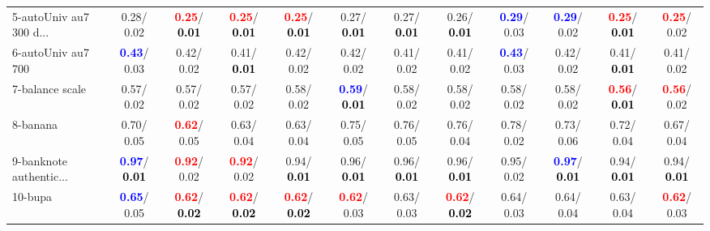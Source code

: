 \begin{table}[h]
\begin{center}
{\begin{tabular}{lc|c|c|c|c|c|c|c|c|c|c}
5-autoUniv au7 300 d... &   0.28/  0.02 & \textcolor{red}{\textbf{  0.25}}/\textcolor{black}{\textbf{  0.01}} & \textcolor{red}{\textbf{  0.25}}/\textcolor{black}{\textbf{  0.01}} & \textcolor{red}{\textbf{  0.25}}/\textcolor{black}{\textbf{  0.01}} &   0.27/\textcolor{black}{\textbf{  0.01}} &   0.27/\textcolor{black}{\textbf{  0.01}} &   0.26/\textcolor{black}{\textbf{  0.01}} & \textcolor{blue}{\textbf{  0.29}}/  0.03 & \textcolor{blue}{\textbf{  0.29}}/  0.02 & \textcolor{red}{\textbf{  0.25}}/\textcolor{black}{\textbf{  0.01}} & \textcolor{red}{\textbf{  0.25}}/  0.02 \\
6-autoUniv au7 700 & \textcolor{blue}{\textbf{  0.43}}/  0.03 &   0.42/  0.02 &   0.41/\textcolor{black}{\textbf{  0.01}} &   0.42/  0.02 &   0.42/  0.02 &   0.41/  0.02 &   0.41/  0.02 & \textcolor{blue}{\textbf{  0.43}}/  0.03 &   0.42/  0.02 &   0.41/\textcolor{black}{\textbf{  0.01}} &   0.41/  0.02 \\
7-balance scale &   0.57/  0.02 &   0.57/  0.02 &   0.57/  0.02 &   0.58/  0.02 & \textcolor{blue}{\textbf{  0.59}}/\textcolor{black}{\textbf{  0.01}} &   0.58/  0.02 &   0.58/  0.02 &   0.58/  0.02 &   0.58/  0.02 & \textcolor{red}{\textbf{  0.56}}/\textcolor{black}{\textbf{  0.01}} & \textcolor{red}{\textbf{  0.56}}/  0.02 \\ \hline
8-banana &   0.70/  0.05 & \textcolor{red}{\textbf{  0.62}}/  0.05 &   0.63/  0.04 &   0.63/  0.04 &   0.75/  0.05 &   0.76/  0.05 &   0.76/  0.04 &   0.78/  0.02 &   0.73/  0.06 &   0.72/  0.04 &   0.67/  0.04 \\
9-banknote authentic... & \textcolor{blue}{\textbf{  0.97}}/\textcolor{black}{\textbf{  0.01}} & \textcolor{red}{\textbf{  0.92}}/  0.02 & \textcolor{red}{\textbf{  0.92}}/  0.02 &   0.94/\textcolor{black}{\textbf{  0.01}} &   0.96/\textcolor{black}{\textbf{  0.01}} &   0.96/\textcolor{black}{\textbf{  0.01}} &   0.96/\textcolor{black}{\textbf{  0.01}} &   0.95/  0.02 & \textcolor{blue}{\textbf{  0.97}}/\textcolor{black}{\textbf{  0.01}} &   0.94/\textcolor{black}{\textbf{  0.01}} &   0.94/\textcolor{black}{\textbf{  0.01}} \\
10-bupa & \textcolor{blue}{\textbf{  0.65}}/  0.05 & \textcolor{red}{\textbf{  0.62}}/\textcolor{black}{\textbf{  0.02}} & \textcolor{red}{\textbf{  0.62}}/\textcolor{black}{\textbf{  0.02}} & \textcolor{red}{\textbf{  0.62}}/\textcolor{black}{\textbf{  0.02}} & \textcolor{red}{\textbf{  0.62}}/  0.03 &   0.63/  0.03 & \textcolor{red}{\textbf{  0.62}}/\textcolor{black}{\textbf{  0.02}} &   0.64/  0.03 &   0.64/  0.04 &   0.63/  0.04 & \textcolor{red}{\textbf{  0.62}}/  0.03 \\

\end{tabular}}
\end{center}
\end{table}
